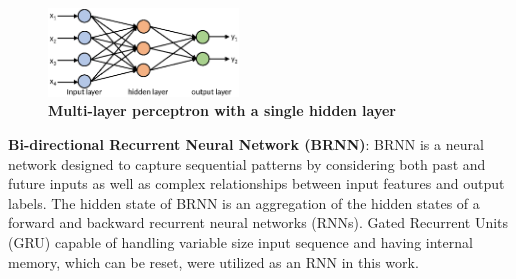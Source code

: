 \documentclass{amia}
\begin{document}
\begin{figure}[!htb]
    \centering
    \includegraphics[width=0.45\textwidth]{figures/mlp.eps}
    \caption{\textbf{Multi-layer perceptron with a single hidden layer}}
    \label{fig:mlp}
\end{figure}

\textbf{Bi-directional Recurrent Neural Network (BRNN)}: BRNN is a neural network designed to capture sequential patterns by considering both past  and future inputs as well as complex relationships between input features and output labels.\cite{schuster1997bidirectional} The hidden state of BRNN is an aggregation of the hidden states of a forward and backward recurrent neural networks (RNNs). Gated Recurrent Units (GRU)\cite{chung2014empirical} capable of handling variable size input sequence and having internal memory, which can be reset, were utilized as an RNN in this work.
\end{document}
